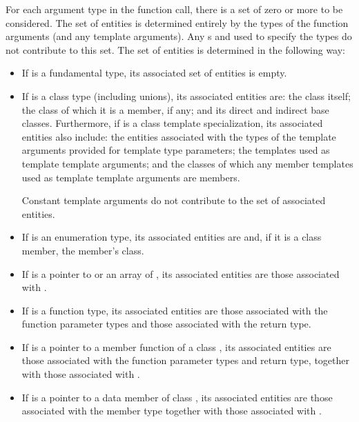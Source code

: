 \documentclass{wg21}
\begin{document}
\pnum
For each argument type  in the function call,
there is a set of zero or more 
to be considered.
The set of entities is determined entirely by
the types of the function arguments
(and any  template arguments).
Any s and 
used to specify the types
do not contribute to this set.
The set of entities
is determined in the following way:
\begin{itemize}
    \item If  is a fundamental type, its associated set of
    entities is empty.

    \item If  is a class type (including unions),
    its associated entities are:
    the class itself;
    the class of which it is a member, if any;
    and its direct and indirect base classes.
    Furthermore, if  is a class template specialization,
    its associated entities also include:
    the entities
    associated with the types of the template arguments
    provided for template type parameters;
    the templates used as  template template arguments; and
    the classes of which any member templates used as   template template
    arguments are members.
    \begin{note}
        Constant template arguments do not
        contribute to the set of associated entities.
    \end{note}

    \item If  is an enumeration type,
    its associated entities are 
    and, if it is a class member, the member's class.

    \item If  is a pointer to  or an array of ,
    its associated entities are those associated with .

    \item If  is a function type, its associated
    entities are those associated with the function parameter types and those
    associated with the return type.

    \item If  is a pointer to a member function of a class
    , its associated entities are those associated
    with the function parameter types and return type, together with those
    associated with .

    \item If  is a pointer to a data member of class , its
    associated entities are those associated with the member
    type together with those associated with .
\end{itemize}
\end{document}

